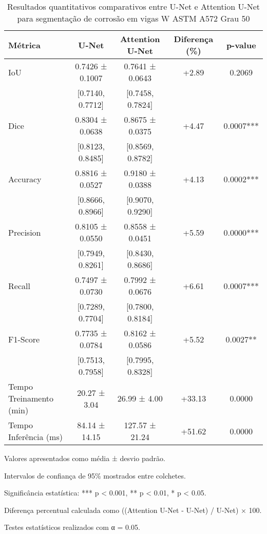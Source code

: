 
\begin{table}[htbp]
\centering
\caption{Resultados quantitativos comparativos entre U-Net e Attention U-Net para segmentação de corrosão em vigas W ASTM A572 Grau 50}
\label{tab:resultados_quantitativos}
\begin{tabular}{lcccc}
\toprule
\textbf{Métrica} & \textbf{U-Net} & \textbf{Attention U-Net} & \textbf{Diferença (\%)} & \textbf{p-value} \\
\midrule
IoU & 0.7426 ± 0.1007 & 0.7641 ± 0.0643 & +2.89 & 0.2069 \\
& [0.7140, 0.7712] & [0.7458, 0.7824] & & \\
Dice & 0.8304 ± 0.0638 & 0.8675 ± 0.0375 & +4.47 & 0.0007*** \\
& [0.8123, 0.8485] & [0.8569, 0.8782] & & \\
Accuracy & 0.8816 ± 0.0527 & 0.9180 ± 0.0388 & +4.13 & 0.0002*** \\
& [0.8666, 0.8966] & [0.9070, 0.9290] & & \\
Precision & 0.8105 ± 0.0550 & 0.8558 ± 0.0451 & +5.59 & 0.0000*** \\
& [0.7949, 0.8261] & [0.8430, 0.8686] & & \\
Recall & 0.7497 ± 0.0730 & 0.7992 ± 0.0676 & +6.61 & 0.0007*** \\
& [0.7289, 0.7704] & [0.7800, 0.8184] & & \\
F1-Score & 0.7735 ± 0.0784 & 0.8162 ± 0.0586 & +5.52 & 0.0027** \\
& [0.7513, 0.7958] & [0.7995, 0.8328] & & \\
\midrule
Tempo Treinamento (min) & 20.27 ± 3.04 & 26.99 ± 4.00 & +33.13 & 0.0000 \\
Tempo Inferência (ms) & 84.14 ± 14.15 & 127.57 ± 21.24 & +51.62 & 0.0000 \\
\bottomrule
\end{tabular}
\begin{tablenotes}
\small
\item Valores apresentados como média ± desvio padrão.
\item Intervalos de confiança de 95\% mostrados entre colchetes.
\item Significância estatística: *** p < 0.001, ** p < 0.01, * p < 0.05.
\item Diferença percentual calculada como ((Attention U-Net - U-Net) / U-Net) × 100.
\item Testes estatísticos realizados com α = 0.05.
\end{tablenotes}
\end{table}
